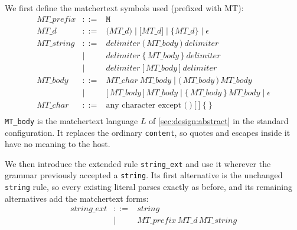 We first define the matchertext symbols used (prefixed with MT):
\[
\begin{array}{rcl}
\mathit{MT\_prefix}
  & ::= & \texttt{M} \\

\mathit{MT\_d}
  & ::= & \texttt{(}\mathit{MT\_d}\texttt{)}
    \mid \texttt{[}\mathit{MT\_d}\texttt{]}
    \mid \texttt{\{}\mathit{MT\_d}\texttt{\}} \mid \epsilon \\

\mathit{MT\_string}
  & ::= & \mathit{delimiter}\ \texttt{(}\,\mathit{MT\_body}\,\texttt{)}\ \mathit{delimiter} \\
  & \mid & \mathit{delimiter}\ \texttt{\{}\,\mathit{MT\_body}\,\texttt{\}}\ \mathit{delimiter} \\
  & \mid & \mathit{delimiter}\ \texttt{[}\,\mathit{MT\_body}\,\texttt{]}\ \mathit{delimiter} \\

\mathit{MT\_body}
  & ::= & \mathit{MT\_char}\ \mathit{MT\_body}
    \mid \texttt{(}\,\mathit{MT\_body}\,\texttt{)}\,\mathit{MT\_body} \\
  & \mid & \texttt{[}\,\mathit{MT\_body}\,\texttt{]}\,\mathit{MT\_body}
    \mid \texttt{\{}\,\mathit{MT\_body}\,\texttt{\}}\,\mathit{MT\_body}
    \mid \epsilon \\

\mathit{MT\_char}
  & ::= & \textrm{any character except } \texttt{(}\ \texttt{)}\ \texttt{[}\ \texttt{]}\ \texttt{\{}\ \texttt{\}} \\
\end{array}
\]
\verb|MT_body| is the matchertext language $L$ of \cref{sec:design:abstract}
in the standard configuration.
It replaces the ordinary \verb|content|,
so quotes and escapes inside it have no meaning to the host.

We then introduce the extended rule \verb|string_ext|
and use it wherever the grammar previously accepted a \verb|string|.
Its first alternative is the unchanged \verb|string| rule,
so every existing literal parses exactly as before,
and its remaining alternatives add the matchertext forms:
\[
\begin{array}{rcl}
\mathit{string\_ext}
  & ::= & \mathit{string} \\
  & \mid & \mathit{MT\_prefix}\,\mathit{MT\_d}\,\mathit{MT\_string}
\end{array}
\]

